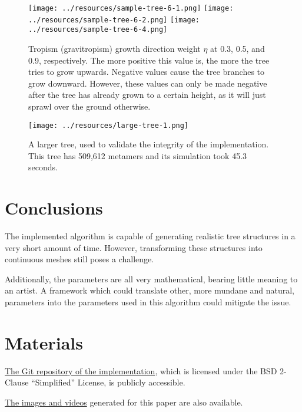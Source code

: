 \documentclass{article}
\begin{document}
\begin{figure}[H]
\centering
\texttt{[image: ../resources/sample-tree-6-1.png]}
\texttt{[image: ../resources/sample-tree-6-2.png]}
\texttt{[image: ../resources/sample-tree-6-4.png]}
\caption{Tropism (gravitropism) growth direction weight \(\eta\) at 0.3, 0.5, and 0.9, respectively. The more positive this value is, the more the tree tries to grow upwards. Negative values cause the tree branches to grow downward. However, these values can only be made negative after the tree has already grown to a certain height, as it will just sprawl over the ground otherwise.}
\end{figure}

\begin{figure}[H]
\centering
\texttt{[image: ../resources/large-tree-1.png]}
\caption{A larger tree, used to validate the integrity of the implementation. This tree has 509,612 metamers and its simulation took 45.3 seconds.}
\end{figure}

\section{Conclusions}

The implemented algorithm is capable of generating realistic tree structures in a very short amount of time. However, transforming these structures into continuous meshes still poses a challenge.

Additionally, the parameters are all very mathematical, bearing little meaning to an artist.
A framework which could translate other, more mundane and natural, parameters into the parameters used in this algorithm could mitigate the issue.

\section{Materials}

\href{https://github.com/bernardosulzbach/self-organizing-tree-models}{The Git repository of the implementation}, which is licensed under the BSD 2-Clause ``Simplified'' License, is publicly accessible.

\href{https://inf.ufrgs.br/~bsulzbach/share/computer-graphics/}{The images and videos} generated for this paper are also available.

\printbibliography
\end{document}
